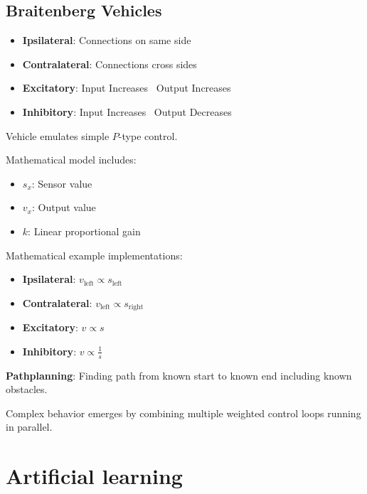 \documentclass[
    fontsize      = 11pt,
    paper         = a4,
    twoside       = false,
    parskip       = half,
    pagesize      = false,
]{scrartcl}
\providecommand{\tightlist}{%
  \setlength{\itemsep}{0pt}\setlength{\parskip}{0pt}}
\begin{document}
\hypertarget{braitenberg-vehicles}{%
\subsection{Braitenberg Vehicles}\label{braitenberg-vehicles}}

\begin{itemize}
\tightlist
\item
  \textbf{Ipsilateral}: Connections on same side
\item
  \textbf{Contralateral}: Connections cross sides
\item
  \textbf{Excitatory}: Input Increases \textrightarrow~Output Increases
\item
  \textbf{Inhibitory}: Input Increases \textrightarrow~Output Decreases
\end{itemize}

Vehicle emulates simple \(P\)-type control.

Mathematical model includes:

\begin{itemize}
\tightlist
\item
  \(s_x\): Sensor value
\item
  \(v_x\): Output value
\item
  \(k\): Linear proportional gain
\end{itemize}

Mathematical example implementations:

\begin{itemize}
\tightlist
\item
  \textbf{Ipsilateral}: \(v_{\text{left}} \propto s_{\text{left}}\)
\item
  \textbf{Contralateral}: \(v_{\text{left}} \propto s_{\text{right}}\)
\item
  \textbf{Excitatory}: \(v \propto s\)
\item
  \textbf{Inhibitory}: \(v \propto \frac{1}{s}\)
\end{itemize}

\textbf{Pathplanning}: Finding path from known start to known end
including known obstacles.

Complex behavior emerges by combining multiple weighted control loops
running in parallel.

\hypertarget{artificial-learning}{%
\section{Artificial learning}\label{artificial-learning}}
\end{document}
